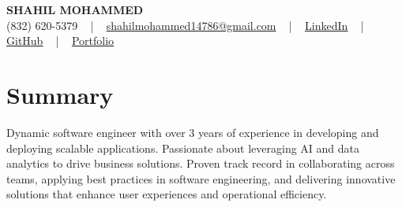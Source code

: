 \documentclass[letterpaper,10pt]{article}
\begin{document}
\begin{center}
    {\fontsize{14pt}{12pt}\selectfont \textbf{\MakeUppercase{Shahil Mohammed}}}\\ \vspace{2pt}
    \fontsize{10pt}{12pt}\selectfont (832) 620-5379 ~ | ~ \href{mailto:shahilmohammed14786@gmail.com}{shahilmohammed14786@gmail.com} ~ | ~  
    \href{https://www.linkedin.com/in/shahil-mohammed-9652931a1/}{\color{blue}\underline{LinkedIn}}  ~ | ~ 
    \href{https://github.com/freakbeast14}{\color{blue}\underline{GitHub}} ~ | ~ 
    \href{https://shahil-mohammed.netlify.app/}{\color{blue}\underline{Portfolio}}
    \vspace{-8pt}
\end{center}

\section{Summary}
\vspace{-2pt}\fontsize{8pt}{9pt}\selectfont
Dynamic software engineer with over 3 years of experience in developing and deploying scalable applications. Passionate about leveraging AI and data analytics to drive business solutions. Proven track record in collaborating across teams, applying best practices in software engineering, and delivering innovative solutions that enhance user experiences and operational efficiency.
 \vspace{-5pt}
 
\vspace{-2pt}
\end{document}
